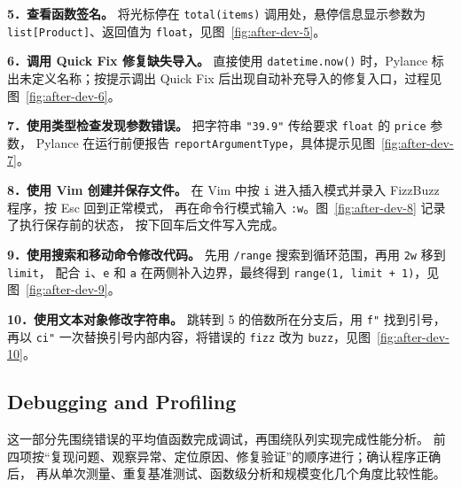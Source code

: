 \documentclass[12pt,a4paper,fontset=fandol]{ctexart}
\begin{document}
\noindent\textbf{5．查看函数签名。}
将光标停在 \texttt{total(items)} 调用处，悬停信息显示参数为
\texttt{list[Product]}、返回值为 \texttt{float}，见图~\ref{fig:after-dev-5}。

\noindent\textbf{6．调用 Quick Fix 修复缺失导入。}
直接使用 \texttt{datetime.now()} 时，Pylance 标出未定义名称；按提示调出
Quick Fix 后出现自动补充导入的修复入口，过程见图~\ref{fig:after-dev-6}。

\noindent\textbf{7．使用类型检查发现参数错误。}
把字符串 \texttt{"39.9"} 传给要求 \texttt{float} 的 \texttt{price} 参数，
Pylance 在运行前便报告 \texttt{reportArgumentType}，具体提示见图~\ref{fig:after-dev-7}。

\noindent\textbf{8．使用 Vim 创建并保存文件。}
在 Vim 中按 \texttt{i} 进入插入模式并录入 FizzBuzz 程序，按 Esc 回到正常模式，
再在命令行模式输入 \texttt{:w}。图~\ref{fig:after-dev-8} 记录了执行保存前的状态，
按下回车后文件写入完成。

\noindent\textbf{9．使用搜索和移动命令修改代码。}
先用 \texttt{/range} 搜索到循环范围，再用 \texttt{2w} 移到 \texttt{limit}，
配合 \texttt{i}、\texttt{e} 和 \texttt{a} 在两侧补入边界，最终得到
\texttt{range(1, limit + 1)}，见图~\ref{fig:after-dev-9}。

\noindent\textbf{10．使用文本对象修改字符串。}
跳转到 5 的倍数所在分支后，用 \texttt{f"} 找到引号，再以 \texttt{ci"}
一次替换引号内部内容，将错误的 \texttt{fizz} 改为 \texttt{buzz}，见图~\ref{fig:after-dev-10}。

\FloatBarrier

\subsection{Debugging and Profiling}

这一部分先围绕错误的平均值函数完成调试，再围绕队列实现完成性能分析。
前四项按“复现问题、观察异常、定位原因、修复验证”的顺序进行；确认程序正确后，
再从单次测量、重复基准测试、函数级分析和规模变化几个角度比较性能。
\end{document}
